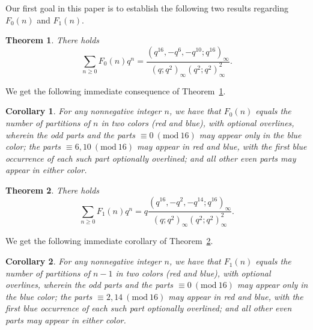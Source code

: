 \documentclass{amsart}
\numberwithin{equation}{section}
\newtheorem{theorem}{Theorem}
\newtheorem{corollary}{Corollary}
\theoremstyle{definition}
\newcommand{\Mod}[1]{\ (\mathrm{mod}\ #1)}
\newcommand{\fr}{\frac}
\begin{document}
%
Our first goal in this paper is to establish the following two results regarding $F_0(n)$ and $F_1(n)$.
\begin{theorem}\label{thm mainF0}
There holds
\[
\sum_{n\geq 0} F_0(n) q^n = \fr{(q^{16},-q^6,-q^{10};q^{16})_\infty}{(q;q^2)_\infty (q^2;q^2)_\infty^2}.
\]
\end{theorem}
We get the following immediate consequence of Theorem~\ref{thm mainF0}.
\begin{corollary}\label{main corF0}
For any nonnegative integer $n$, we have that
$F_0(n)$ equals the number of partitions of $n$ in two colors (red and blue), with optional overlines,
wherein the odd parts and the parts $\equiv 0 \Mod{16}$ may appear only in the blue color; the parts $\equiv 6,10 \Mod{16}$ may appear in red and blue, with the first blue occurrence of each such part optionally overlined; and all other even parts may appear in either color.
\end{corollary}
%
\begin{theorem}\label{thm mainF1}
There holds
\[
\sum_{n\geq 0} F_1(n) q^n = q\fr{(q^{16},-q^2,-q^{14};q^{16})_\infty}{(q;q^2)_\infty (q^2;q^2)_\infty^2}.
\]
\end{theorem}
We get the following immediate corollary of Theorem~\ref{thm mainF1}.
\begin{corollary}\label{main corF1}
For any nonnegative integer $n$, we have that
$F_1(n)$ equals the number of partitions of $n-1$ in two colors (red and blue), with optional overlines,
wherein the odd parts and the parts $\equiv 0 \Mod{16}$ may appear only in the blue color; the parts $\equiv 2,14 \Mod{16}$ may appear in red and blue, with the first blue occurrence of each such part optionally overlined; and all other even parts may appear in either color.
\end{corollary}
\end{document}

